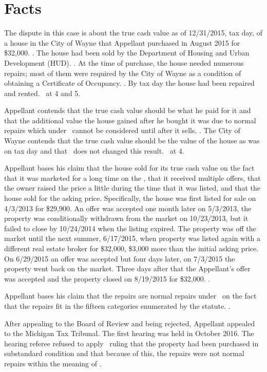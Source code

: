 \documentclass[12pt,\documentclassflag]{michiganCourtOfAppealsBrief}
\begin{document}
\section{Facts}
The dispute in this case is about the true cash value as of 12/31/2015, tax day, of a house in the City of Wayne that Appellant purchased in August 2015 for \$32,000. \mlsprintout. The house had been sold by the Department of Housing and Urban Development (HUD). \mlsprintout. At the time of purchase, the house needed numerous repairs; most of them were required by the City of Wayne as a condition of obtaining a Certificate of Occupancy. \repairs. By tax day the house had been repaired and rented. \FOJ\ at 4 and 5.

Appellant contends that the true cash value should be what he paid for it and that the additional value the house gained after he bought it was due to normal repairs which under \mathieuGast\ cannot be considered until after it sells. \explanatoryLetter. The City of Wayne contends that the true cash value should be the value of the house as was on tax day and that \mathieuGast\ does not changed this result. \FOJ\ at 4.

Appellant bases his claim that the house sold for its true cash value on the fact that it was marketed for a long time on the \MLS, that it received multiple offers, that the owner raised the price a little during the time that it was listed, and that the house sold for the asking price. Specifically, the house was first listed for sale on 4/3/2013 for \$29,900. An offer was accepted one month later on 5/3/2013, the property was conditionally withdrawn from the market on 10/23/2013, but it failed to close by 10/24/2014 when the listing expired. The property was off the market until the next summer, 6/17/2015, when property was listed again with a different real estate broker for \$32,000, \$3,000 more than the initial asking price. On 6/29/2015 an offer was accepted but four days later, on 7/3/2015 the property went back on the market. Three days after that the Appellant's offer was accepted and the property closed on 8/19/2015 for \$32,000. \mlsprintout.

Appellant bases his claim that the repairs are normal repairs under \mathieuGast\ on the fact that the repairs fit in the fifteen categories enumerated by the statute. \repairs.

After appealing to the Board of Review and being rejected, Appellant appealed to the Michigan Tax Tribunal. The first hearing was held in October 2016. The hearing referee refused to apply \mathieuGast\ ruling that the property had been purchased in substandard condition and that because of this, the repairs were not normal repairs within the meaning of \mathieuGast. 
\end{document}
